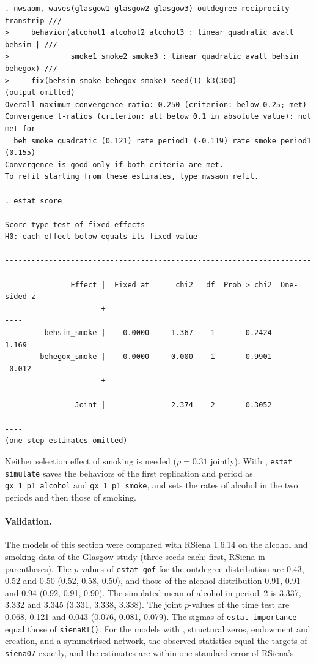 \begin{lstlisting}
. nwsaom, waves(glasgow1 glasgow2 glasgow3) outdegree reciprocity transtrip ///
>     behavior(alcohol1 alcohol2 alcohol3 : linear quadratic avalt behsim | ///
>              smoke1 smoke2 smoke3 : linear quadratic avalt behsim behegox) ///
>     fix(behsim_smoke behegox_smoke) seed(1) k3(300)
(output omitted)
Overall maximum convergence ratio: 0.250 (criterion: below 0.25; met)
Convergence t-ratios (criterion: all below 0.1 in absolute value): not met for
  beh_smoke_quadratic (0.121) rate_period1 (-0.119) rate_smoke_period1 (0.155)
Convergence is good only if both criteria are met.
To refit starting from these estimates, type nwsaom refit.

. estat score

Score-type test of fixed effects
H0: each effect below equals its fixed value

--------------------------------------------------------------------------
               Effect |  Fixed at      chi2   df  Prob > chi2  One-sided z
----------------------+---------------------------------------------------
         behsim_smoke |    0.0000     1.367    1       0.2424        1.169
        behegox_smoke |    0.0000     0.000    1       0.9901       -0.012
----------------------+---------------------------------------------------
                Joint |               2.374    2       0.3052
--------------------------------------------------------------------------
(one-step estimates omitted)
\end{lstlisting}
Neither selection effect of smoking is needed ($p=0.31$ jointly). With , \texttt{estat simulate} saves the behaviors of the first replication and period as \texttt{gx\_1\_p1\_alcohol} and \texttt{gx\_1\_p1\_smoke}, and  sets the rates of alcohol in the two periods and then those of smoking.

\paragraph{Validation.} The models of this section were compared with RSiena 1.6.14 on the alcohol and smoking data of the Glasgow study (three seeds each; \nwsaom{} first, RSiena in parentheses). The $p$-values of \texttt{estat gof} for the outdegree distribution are 0.43, 0.52 and 0.50 (0.52, 0.58, 0.50), and those of the alcohol distribution 0.91, 0.91 and 0.94 (0.92, 0.91, 0.90). The simulated mean of alcohol in period~2 is 3.337, 3.332 and 3.345 (3.331, 3.338, 3.338). The joint $p$-values of the time test are 0.068, 0.121 and 0.043 (0.076, 0.081, 0.079). The sigmas of \texttt{estat importance} equal those of \texttt{sienaRI()}. For the models with , structural zeros, endowment and creation, and a symmetrised network, the observed statistics equal the targets of \texttt{siena07} exactly, and the estimates are within one standard error of RSiena's.

